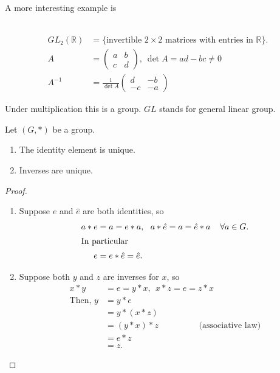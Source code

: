 A more interesting example is

\begin{example} \protect\hypertarget{exm:glg}{}\label{exm:glg}
~\vspace*{-1.5\baselineskip}
\begin{align*}
    GL_2 (\mathbb{R}) &= \{ \text{invertible $2 \times 2$ matrices with entries in } \mathbb{R} \}. \\
    A &= \begin{pmatrix}
    a & b \\
    c & d
    \end{pmatrix},\ \det A = ad - bc \neq 0  \\
    A^{-1} &= \frac{1}{\det A} \begin{pmatrix}
    d & -b \\
    -c & -a
    \end{pmatrix}
\end{align*}

Under multiplication this is a group. $GL$ stands for general linear group.
\end{example}

\begin{lemma}
\protect\hypertarget{lem:one}{}\label{lem:one}

Let $(G, *)$ be a group.

\begin{enumerate}
\def\labelenumi{\roman{enumi}.}
\item
  The identity element is unique.
\item
  Inverses are unique.
\end{enumerate}

\end{lemma}

\begin{proof}
~
\begin{enumerate}
  \def\labelenumi{\roman{enumi}.}
  \item
  Suppose $e$ and $\hat{e}$ are both identities, so
  \begin{align*}
      a * e &= a = e * a,\ \ a * \hat{e} = a = \hat{e} * a \hspace{0.4cm }\forall a \in G. \\
      \intertext{In particular}
      e &= e * \hat{e} = \hat{e}.
  \end{align*}
  \item
  Suppose both $y$ and $z$ are inverses for $x$, so
  \begin{align*}
      x * y &= e = y * x,\ \ x * z = e = z * x \\
      \text{Then, } y &= y * e \\
      &= y * (x * z) \\
      &= (y * x) * z \hspace{2cm} \text{(associative law)} \\
      &= e * z \\
      &= z.
  \end{align*}
  \end{enumerate}
\end{proof}

